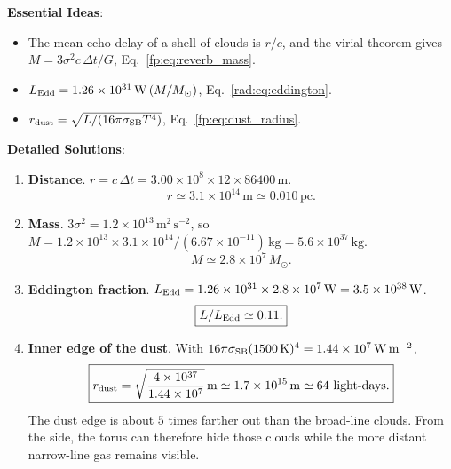 \textbf{Essential Ideas}:
\begin{itemize}
	\item The mean echo delay of a shell of clouds is $r/c$, and the virial theorem gives $M=3\sigma^2c\,\Delta t/G$, Eq.~\eqref{fp:eq:reverb_mass}.
	\item $L_{\rm Edd}=1.26\times10^{31}\,\mathrm W\,(M/M_\odot)$, Eq.~\eqref{rad:eq:eddington}.
	\item $r_{\rm dust}=\sqrt{L/(16\pi\sigma_{\rm SB}T^4)}$, Eq.~\eqref{fp:eq:dust_radius}.
\end{itemize}

\textbf{Detailed Solutions}:
\begin{enumerate}[label=(\alph*)]
	\item \textbf{Distance}. $r=c\,\Delta t=3.00\times10^8\times12\times86400\,\mathrm m$.
	\[
	\boxed{r\simeq3.1\times10^{14}\,\mathrm m\simeq0.010\,\mathrm{pc}.}
	\]
	\item \textbf{Mass}. $3\sigma^2=1.2\times10^{13}\,\mathrm{m^2\,s^{-2}}$, so $M=1.2\times10^{13}\times3.1\times10^{14}/(6.67\times10^{-11})\,\mathrm{kg}=5.6\times10^{37}\,\mathrm{kg}$.
	\[
	\boxed{M\simeq2.8\times10^7\,M_\odot.}
	\]
	\item \textbf{Eddington fraction}. $L_{\rm Edd}=1.26\times10^{31}\times2.8\times10^7\,\mathrm W=3.5\times10^{38}\,\mathrm W$.
	\[
	\boxed{L/L_{\rm Edd}\simeq0.11.}
	\]
	\item \textbf{Inner edge of the dust}. With $16\pi\sigma_{\rm SB}(1500\,\mathrm K)^4=1.44\times10^7\,\mathrm{W\,m^{-2}}$,
	\[
	\boxed{r_{\rm dust}=\sqrt{\frac{4\times10^{37}}{1.44\times10^7}}\,\mathrm m\simeq1.7\times10^{15}\,\mathrm m\simeq64\ \text{light-days}.}
	\]
	The dust edge is about $5$ times farther out than the broad-line clouds. From the side, the torus can therefore hide those clouds while the more distant narrow-line gas remains visible.
\end{enumerate}
